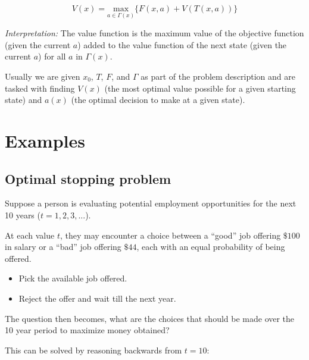 \documentclass[a4paper, 12pt]{article}
\begin{document}
\[
  V(x) = \underset{a \in \Gamma(x)}{\text{max}}\{F(x, a) + V(T(x, a))\}
\]

\emph{Interpretation:} The value function is the maximum value of the objective function (given the current $a$) added to the value function of the next state (given the current $a$) for all $a$ in $\Gamma(x)$.

Usually we are given $x_0$, $T$, $F$, and $\Gamma$ as part of the problem description and are tasked with finding $V(x)$ (the most optimal value possible for a given starting state) and $a(x)$ (the optimal decision to make at a given state).

\section{Examples}

\subsection{Optimal stopping problem}

Suppose a person is evaluating potential employment opportunities for the next 10 years ($t = 1, 2, 3, ...$).

At each value $t$, they may encounter a choice between a ``good'' job offering $\$100$ in salary or a ``bad'' job offering $\$44$, each with an equal probability of being offered. 

\begin{itemize}
  \item Pick the available job offered.
  \item Reject the offer and wait till the next year.
\end{itemize}

The question then becomes, what are the choices that should be made over the 10 year period to maximize money obtained?

This can be solved by reasoning backwards from $t=10$:
\end{document}
